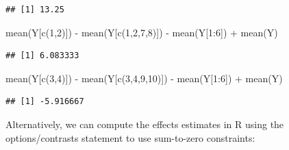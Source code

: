 \documentclass[
]{book}
\newenvironment{Shaded}{\begin{snugshade}}{\end{snugshade}}
\newcommand{\DecValTok}[1]{\textcolor[rgb]{0.00,0.00,0.81}{#1}}
\newcommand{\FunctionTok}[1]{\textcolor[rgb]{0.00,0.00,0.00}{#1}}
\newcommand{\NormalTok}[1]{#1}
\newcommand{\SpecialCharTok}[1]{\textcolor[rgb]{0.00,0.00,0.00}{#1}}
\begin{document}
\begin{verbatim}
## [1] 13.25
\end{verbatim}

\begin{Shaded}
\begin{Highlighting}[]
\FunctionTok{mean}\NormalTok{(Y[}\FunctionTok{c}\NormalTok{(}\DecValTok{1}\NormalTok{,}\DecValTok{2}\NormalTok{)]) }\SpecialCharTok{{-}} \FunctionTok{mean}\NormalTok{(Y[}\FunctionTok{c}\NormalTok{(}\DecValTok{1}\NormalTok{,}\DecValTok{2}\NormalTok{,}\DecValTok{7}\NormalTok{,}\DecValTok{8}\NormalTok{)]) }\SpecialCharTok{{-}} \FunctionTok{mean}\NormalTok{(Y[}\DecValTok{1}\SpecialCharTok{:}\DecValTok{6}\NormalTok{]) }\SpecialCharTok{+} \FunctionTok{mean}\NormalTok{(Y)}
\end{Highlighting}
\end{Shaded}

\begin{verbatim}
## [1] 6.083333
\end{verbatim}

\begin{Shaded}
\begin{Highlighting}[]
\FunctionTok{mean}\NormalTok{(Y[}\FunctionTok{c}\NormalTok{(}\DecValTok{3}\NormalTok{,}\DecValTok{4}\NormalTok{)]) }\SpecialCharTok{{-}} \FunctionTok{mean}\NormalTok{(Y[}\FunctionTok{c}\NormalTok{(}\DecValTok{3}\NormalTok{,}\DecValTok{4}\NormalTok{,}\DecValTok{9}\NormalTok{,}\DecValTok{10}\NormalTok{)]) }\SpecialCharTok{{-}} \FunctionTok{mean}\NormalTok{(Y[}\DecValTok{1}\SpecialCharTok{:}\DecValTok{6}\NormalTok{]) }\SpecialCharTok{+} \FunctionTok{mean}\NormalTok{(Y)}
\end{Highlighting}
\end{Shaded}

\begin{verbatim}
## [1] -5.916667
\end{verbatim}

Alternatively, we can compute the effects estimates in R using the options/contrasts statement to use sum-to-zero constraints:
\end{document}
